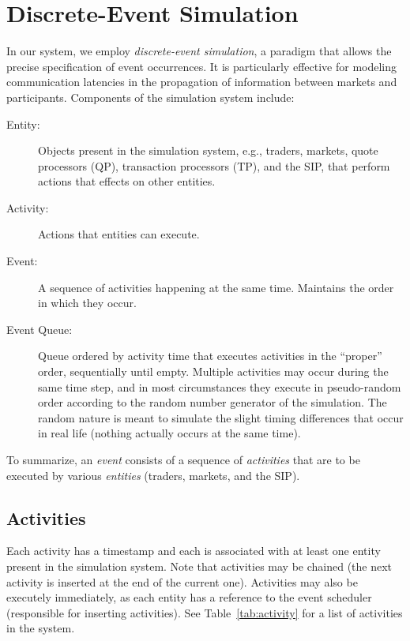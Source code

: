 \documentclass[11pt]{article}
\begin{document}
\section{Discrete-Event Simulation}

In our system, we employ \emph{discrete-event simulation}, a paradigm that
allows the precise specification of event occurrences. It is particularly
effective for modeling communication latencies in the propagation of information between markets and participants.
Components of the simulation system include:

\begin{description}
\item[Entity:] Objects present in the simulation system, e.g., traders, markets, quote processors (QP), transaction processors (TP), and the SIP, that perform actions that effects on other entities.

\item[Activity:] Actions that entities can execute.

\item[Event:] A sequence of activities happening at the same time. Maintains the
  order in which they occur.

\item[Event Queue:] Queue ordered by activity time that executes activities in
  the ``proper'' order, sequentially until empty. Multiple activities may occur
  during the same time step, and in most circumstances they
  execute in pseudo-random order according to the random number generator of the
  simulation. The random nature is meant to simulate the slight timing
  differences that occur in real life (nothing actually occurs at the same
  time).
\end{description}

To summarize, an \emph{event} consists of a sequence of \emph{activities} that
are to be executed by various \emph{entities} (traders, markets, and the SIP).


\subsection{Activities}

Each activity has a timestamp and each is associated with at least one entity
present in the simulation system. Note that activities may be chained (the next activity is inserted at the end of the current one).
Activities may also be executely immediately, as each entity has a reference to the event scheduler (responsible for inserting activities). See
Table~\ref{tab:activity} for a list of activities in the system.
\end{document}
